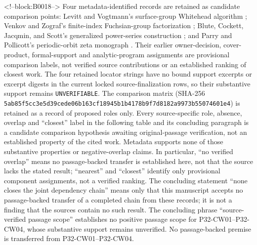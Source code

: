 \documentclass[11pt]{article}
\begin{document}
<!--block:B0018-->
Four metadata-identified records are retained as candidate comparison points:
Levitt and Vogtmann's surface-group Whitehead algorithm \citep{P32-CW01};
Venkov and Zograf's finite-index Fuchsian-group factorization \citep{P32-CW02};
Blute, Cockett, Jacqmin, and Scott's generalized power-series construction
\citep{P32-CW03}; and Parry and Pollicott's periodic-orbit zeta monograph
\citep{P32-CW04}. Their earlier owner-decision, cover-product, formal-support and
analytic-program assignments are provisional comparison labels, not verified
source contributions or an established ranking of closest work. The four retained
locator strings have no bound support excerpts or excerpt digests in the current
locked source-finalization rows, so their substantive support remains
\texttt{UNVERIFIABLE}. The comparison matrix
(SHA-256 \texttt{5ab85f5c\allowbreak{}c3e5d39c\allowbreak{}ede06b16\allowbreak{}3cf18945\allowbreak{}b1b4178b\allowbreak{}9f7d8182\allowbreak{}a9973b55\allowbreak{}074601e4})
is retained as a record of proposed roles only. Every source-specific role,
absence, overlap and ``closest'' label in the following table and its concluding paragraph is a candidate
comparison hypothesis awaiting original-passage verification, not an established
property of the cited work. Metadata supports none of those substantive properties
or negative-overlap claims. In particular, ``no verified overlap'' means no
passage-backed transfer is established here, not that the source lacks the stated
result; ``nearest'' and ``closest'' identify only provisional component assignments,
not a verified ranking. The concluding statement ``none closes the joint
dependency chain'' means only that this manuscript accepts no passage-backed
transfer of a completed chain from these records; it is not a finding that the
sources contain no such result. The concluding phrase ``source-verified passage
scope'' establishes no positive passage scope for P32-CW01--P32-CW04, whose
substantive support remains unverified. No passage-backed premise is transferred
from P32-CW01--P32-CW04.
\end{document}
